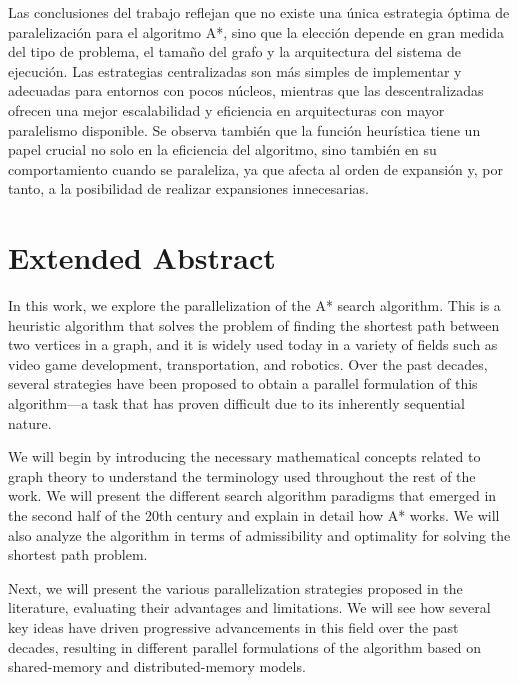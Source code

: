 \documentclass[a4paper,12pt]{article}
\begin{document}
Las conclusiones del trabajo reflejan que no existe una única estrategia óptima de paralelización para el algoritmo A*, sino que la elección depende en gran medida del tipo de problema, el tamaño del grafo y la arquitectura del sistema de ejecución. Las estrategias centralizadas son más simples de implementar y adecuadas para entornos con pocos núcleos, mientras que las descentralizadas ofrecen una mejor escalabilidad y eficiencia en arquitecturas con mayor paralelismo disponible. Se observa también que la función heurística tiene un papel crucial no solo en la eficiencia del algoritmo, sino también en su comportamiento cuando se paraleliza, ya que afecta al orden de expansión y, por tanto, a la posibilidad de realizar expansiones innecesarias.




\newpage

\section*{Extended Abstract}
\thispagestyle{empty}

In this work, we explore the parallelization of the A* search algorithm. This is a heuristic algorithm that solves the problem of finding the shortest path between two vertices in a graph, and it is widely used today in a variety of fields such as video game development, transportation, and robotics. Over the past decades, several strategies have been proposed to obtain a parallel formulation of this algorithm—a task that has proven difficult due to its inherently sequential nature.

We will begin by introducing the necessary mathematical concepts related to graph theory to understand the terminology used throughout the rest of the work. We will present the different search algorithm paradigms that emerged in the second half of the 20th century and explain in detail how A* works. We will also analyze the algorithm in terms of admissibility and optimality for solving the shortest path problem.

Next, we will present the various parallelization strategies proposed in the literature, evaluating their advantages and limitations. We will see how several key ideas have driven progressive advancements in this field over the past decades, resulting in different parallel formulations of the algorithm based on shared-memory and distributed-memory models.
\end{document}
